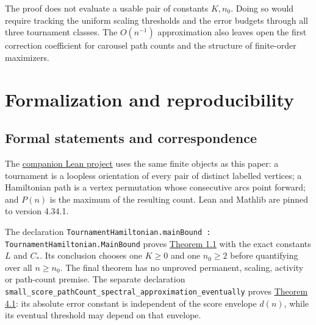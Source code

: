 \documentclass[11pt,a4paper]{article}
\newcommand{\paperref}[2]{\hyperref[#1]{#2}}
\begin{document}
The proof does not evaluate a usable pair of constants \(K,n_0\). Doing so would require tracking the uniform scaling thresholds and the error budgets through all three tournament classes. The \(O(n^{-1})\) approximation also leaves open the first correction coefficient for carousel path counts and the structure of finite-order maximizers.

\appendix

\section{Formalization and reproducibility}\label{sec-A}

\subsection{Formal statements and correspondence}\label{sec-A.1}

The \href{https://github.com/LStar404/tournament-hamiltonian-paths/tree/8ea3fcffcc12b6a06294ba7559885b439eda3cac/formalization}{companion Lean project} uses the same finite objects as this paper: a tournament is a loopless orientation of every pair of distinct labelled vertices; a Hamiltonian path is a vertex permutation whose consecutive arcs point forward; and \(P(n)\) is the maximum of the resulting count. Lean and Mathlib are pinned to version 4.34.1.

The declaration \texttt{Tournament\allowbreak{}Hamiltonian.\allowbreak{}main\allowbreak{}Bound : Tournament\allowbreak{}Hamiltonian.\allowbreak{}Main\allowbreak{}Bound} proves \paperref{thm-1.1}{Theorem 1.1} with the exact constants \(L\) and \(C_*\). Its conclusion chooses one \(K\ge0\) and one \(n_0\ge2\) before quantifying over all \(n\ge n_0\). The final theorem has no unproved permanent, scaling, activity or path-count premise. The separate declaration \texttt{small\_\allowbreak{}score\_\allowbreak{}path\allowbreak{}Count\_\allowbreak{}spectral\_\allowbreak{}approximation\_\allowbreak{}eventually} proves \paperref{thm-4.1}{Theorem 4.1}: its absolute error constant is independent of the score envelope \(d(n)\), while its eventual threshold may depend on that envelope.
\end{document}
